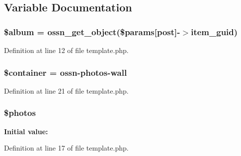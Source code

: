 \subsection{Variable Documentation}
\subsubsection[{\texorpdfstring{\$album}{$album}}]{\setlength{\rightskip}{0pt plus 5cm}\$album = {\bf ossn\+\_\+get\+\_\+object}(\$params\mbox{[}\textquotesingle{}post\textquotesingle{}\mbox{]}-\/$>$item\+\_\+guid)}\hypertarget{template_8php_ac40a9764673b6d86593dc674331c5116}{}\label{template_8php_ac40a9764673b6d86593dc674331c5116}


Definition at line 12 of file template.\+php.

\subsubsection[{\texorpdfstring{\$container}{$container}}]{\setlength{\rightskip}{0pt plus 5cm}\$container = \textquotesingle{}ossn-\/photos-\/wall\textquotesingle{}}\hypertarget{template_8php_ab97dd40df90f4ce6f0fce9091e7c7872}{}\label{template_8php_ab97dd40df90f4ce6f0fce9091e7c7872}


Definition at line 21 of file template.\+php.

\subsubsection[{\texorpdfstring{\$photos}{$photos}}]{\setlength{\rightskip}{0pt plus 5cm}\$photos}\hypertarget{template_8php_a7d16539c7a3688bee1d3184c81c47487}{}\label{template_8php_a7d16539c7a3688bee1d3184c81c47487}
{\bfseries Initial value\+:}


Definition at line 17 of file template.\+php.


